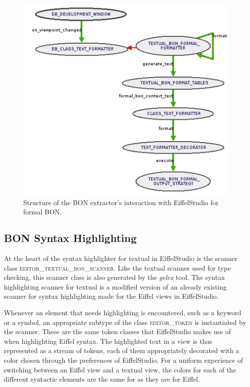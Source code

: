 \begin{figure}[H]
\centerline{
\includegraphics[scale=0.7]{images/BON-extractor-structure-large.png}
}
\caption{Structure of the BON extractor's interaction with EiffelStudio for formal BON.}
\label{fig:extractor_structure}
\end{figure}

\subsection{BON Syntax Highlighting}
At the heart of the syntax highlighter for textual \bon{} in EiffelStudio is the scanner class \textsc{editor\_textual\_bon\_scanner}. Like the textual \bon{} scanner used for type checking, this scanner class is also generated by the \textit{gelex} tool. The syntax highlighting scanner for textual \bon{} is a modified version of an already existing scanner for syntax highlighting made for the Eiffel views in EiffelStudio. 

Whenever an element that needs highlighting is encountered, such as a keyword or a symbol, an appropriate subtype of the class \textsc{editor\_token} is instantiated by the scanner. These are the same token classes that EiffelStudio makes use of when highlighting Eiffel syntax. The highlighted text in a view is thus represented as a stream of tokens, each of them appropriately decorated with a color chosen through the preferences of EiffelStudio. For a uniform experience of switching between an Eiffel view and a textual \bon{} view, the colors for each of the different syntactic elements are the same for \bon{} as they are for Eiffel.

